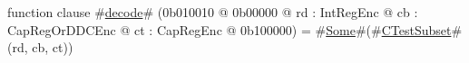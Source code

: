 function clause #\hyperref[zdecode]{decode}# (0b010010 @ 0b00000 @ rd : IntRegEnc @ cb : CapRegOrDDCEnc @ ct : CapRegEnc @ 0b100000) = #\hyperref[zSome]{Some}#(#\hyperref[zCTestSubset]{CTestSubset}#(rd, cb, ct))
